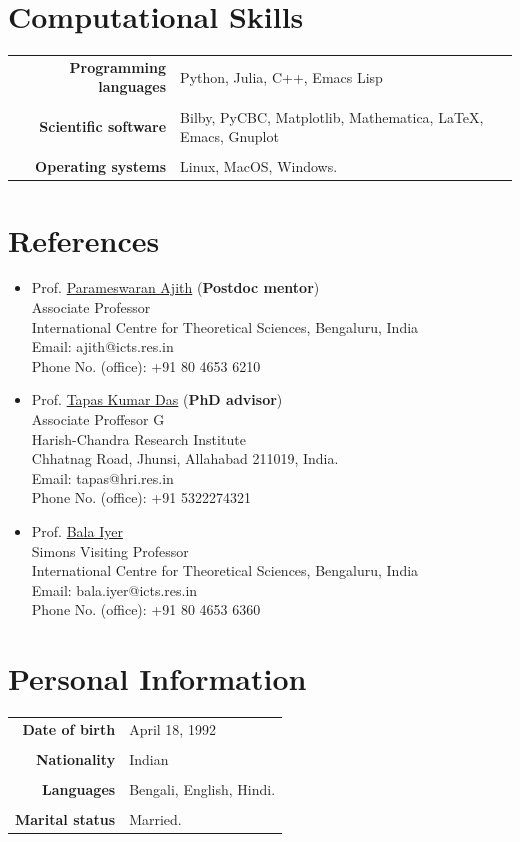 \documentclass[10pt]{article}
\begin{document}
\section{Computational Skills}
\begin{longtable}{r|p{16cm}}
{\bfseries Programming languages} & Python, Julia, C++, Emacs Lisp\\\\
{\bfseries Scientific software} & Bilby, PyCBC, Matplotlib, Mathematica, \LaTeX, Emacs, Gnuplot\\\\
{\bfseries Operating systems} & Linux, MacOS, Windows.
\end{longtable}


\section{References}
\begin{itemize}

\item Prof. \href{https://home.icts.res.in/~ajith/Home.html}{Parameswaran Ajith} ({\bfseries Postdoc mentor})\\
  Associate Professor\\
  International Centre for Theoretical Sciences, Bengaluru, India\\
  Email: {ajith@icts.res.in}\\
  Phone No. (office): +91 80 4653 6210

  
\item Prof. \href{http://www.hri.res.in/people/Physics/tapas}{Tapas Kumar Das} ({\bfseries PhD advisor})\\
  Associate Proffesor G\\
  Harish-Chandra Research Institute\\
  Chhatnag Road, Jhunsi, Allahabad 211019, India.\\
  Email: {tapas@hri.res.in}\\
  Phone No. (office): +91 5322274321

\item Prof. \href{https://www.icts.res.in/people/bala-iyer}{Bala Iyer}\\
  Simons Visiting Professor\\
  International Centre for Theoretical Sciences, Bengaluru, India\\
  Email: {bala.iyer@icts.res.in}\\
  Phone No. (office): +91 80 4653 6360
\end{itemize}


\section{Personal Information}
\begin{longtable}{r|p{16cm}}
{\bfseries Date of birth} & April 18, 1992\\\\
{\bfseries Nationality} & Indian\\\\
{\bfseries Languages} & Bengali, English, Hindi.\\\\
{\bfseries Marital status} & Married.
\end{longtable}
\end{document}
